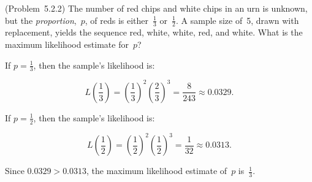 \begin{problem}
  (\textnormal{Problem~5.2.2}) The number of red chips and white chips in an urn is unknown, but the \textit{proportion},~$p$, of reds is either~$\frac{1}{3}$ or~$\frac{1}{2}$. A sample size of~5, drawn with replacement, yields the sequence red, white, white, red, and white.  What is the maximum likelihood estimate for~$p$?
\end{problem}

If ${p=\frac{1}{3}}$, then the sample's likelihood is:

\begin{equation}\label{eq:P01:1s3Likelihood}
  L\left(\frac{1}{3}\right) = \left(\frac{1}{3}\right)^2 \left( \frac{2}{3} \right)^{3} = \frac{8}{243} \approx 0.0329\text{.}
\end{equation}

\noindent
If ${p=\frac{1}{2}}$, then the sample's likelihood is:

\begin{equation}\label{eq:P01:1s2Likelihood}
  L\left(\frac{1}{2}\right) = \left(\frac{1}{2}\right)^2 \left( \frac{1}{2} \right)^{3} = \frac{1}{32} \approx 0.0313\text{.}
\end{equation}

\noindent
Since ${0.0329 > 0.0313}$, the maximum likelihood estimate of~$p$ is~$\frac{1}{3}$.
